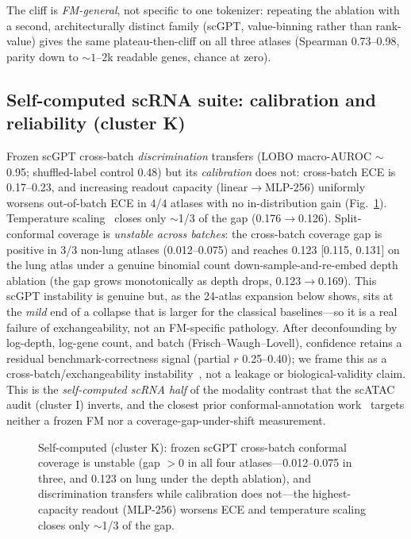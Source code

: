 \documentclass[11pt]{article}
\begin{document}
The cliff is \emph{FM-general}, not specific to one tokenizer: repeating the ablation with a second, architecturally distinct family (scGPT, value-binning rather than rank-value) gives the same plateau-then-cliff on all three atlases (Spearman 0.73--0.98, parity down to ${\sim}1$--$2$k readable genes, chance at zero).

\FloatBarrier
\subsection{Self-computed scRNA suite: calibration and reliability (cluster K)}
Frozen scGPT cross-batch \emph{discrimination} transfers (LOBO macro-AUROC $\sim$0.95; shuffled-label control 0.48) but its \emph{calibration} does not: cross-batch ECE is 0.17--0.23, and increasing readout capacity (linear$\to$MLP-256) uniformly worsens out-of-batch ECE in 4/4 atlases with no in-distribution gain (Fig.~\ref{fig:scrnacalib}). Temperature scaling~\cite{guo2017} closes only $\sim$1/3 of the gap (0.176$\to$0.126). Split-conformal coverage is \emph{unstable across batches}: the cross-batch coverage gap is positive in 3/3 non-lung atlases (0.012--0.075) and reaches 0.123 [0.115, 0.131] on the lung atlas under a genuine binomial count down-sample-and-re-embed depth ablation (the gap grows monotonically as depth drops, 0.123$\to$0.169). This scGPT instability is genuine but, as the 24-atlas expansion below shows, sits at the \emph{mild} end of a collapse that is larger for the classical baselines---so it is a real failure of exchangeability, not an FM-specific pathology. After deconfounding by log-depth, log-gene count, and batch (Frisch--Waugh--Lovell), confidence retains a residual benchmark-correctness signal (partial $r$ 0.25--0.40); we frame this as a cross-batch/exchangeability instability~\cite{barber2023}, not a leakage or biological-validity claim. This is the \emph{self-computed scRNA half} of the modality contrast that the scATAC audit (cluster I) inverts, and the closest prior conformal-annotation work~\cite{lopezdecastro2025} targets neither a frozen FM nor a coverage-gap-under-shift measurement.

\begin{figure}[htb]\centering
\caption{Self-computed (cluster K): frozen scGPT cross-batch conformal coverage is unstable (gap $>0$ in all four atlases---0.012--0.075 in three, and 0.123 on lung under the depth ablation), and discrimination transfers while calibration does not---the highest-capacity readout (MLP-256) worsens ECE and temperature scaling closes only $\sim$1/3 of the gap.}\label{fig:scrnacalib}\end{figure}
\end{document}
